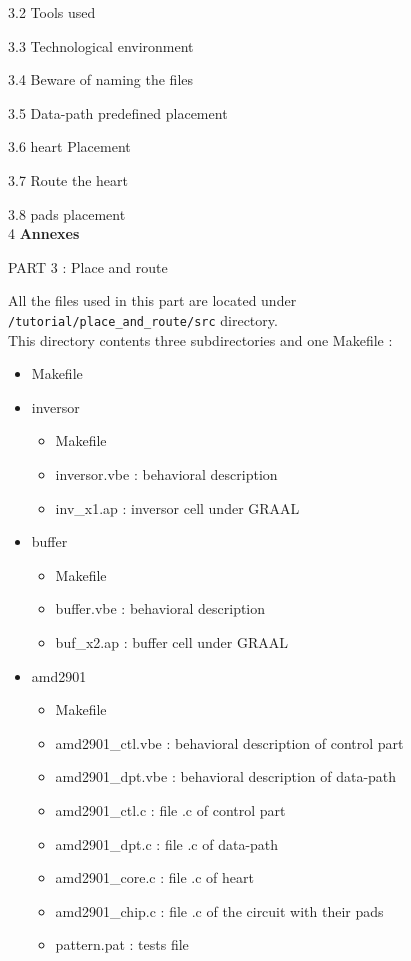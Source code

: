 \documentclass[12pt]{article}
\begin{document}
{3.2} Tools used

{3.3} Technological environment

{3.4} Beware of naming the files

{3.5} Data-path predefined placement

{3.6} heart Placement

{3.7} Route the heart

{3.8} pads placement
\\
{4} {\bf Annexes} 
 
\newpage
       {\huge
        PART 3 : }
        \vspace{1cm}
        {\huge
        Place and route
        }
 
All the files used in this part are located under \\
\texttt{/tutorial/place\_and\_route/src} directory.\\
This directory contents three subdirectories and one Makefile :

\begin{itemize}\itemsep=-.8ex

\item   Makefile
\item   inversor
    \begin{itemize}\itemsep=-.8ex
    \item   Makefile
    \item   inversor.vbe : behavioral description 
    \item   inv\_x1.ap : inversor cell under GRAAL
    \end{itemize}
\item   buffer
    \begin{itemize}\itemsep=-.8ex
    \item   Makefile
    \item   buffer.vbe : behavioral description
    \item   buf\_x2.ap : buffer cell under GRAAL
    \end{itemize}
\item  amd2901 
    \begin{itemize}\itemsep=-.8ex
    \item   Makefile
    \item   amd2901\_ctl.vbe : behavioral description of control
    part
    \item   amd2901\_dpt.vbe : behavioral description of data-path
    \item   amd2901\_ctl.c : file .c of control part
    \item   amd2901\_dpt.c : file .c of data-path
    \item   amd2901\_core.c : file .c of heart
    \item   amd2901\_chip.c : file .c of the circuit with their
    pads
    \item   pattern.pat : tests file
    \end{itemize}
\end{itemize}
\end{document}
